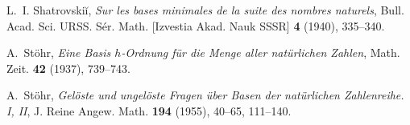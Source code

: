 \documentclass{amsart}
\begin{document}
\begin{thebibliography}{10}
L.~I. Shatrovski\u{i}, \emph{Sur les bases minimales de la suite des nombres
  naturels}, Bull. Acad. Sci. URSS. S\'er. Math. [Izvestia Akad. Nauk SSSR]
  \textbf{4} (1940), 335--340.

A.~St{\"o}hr, \emph{Eine {B}asis {$h$-O}rdnung f{\" u}r die {M}enge aller
  nat{\" u}rlichen {Z}ahlen}, Math. Zeit. \textbf{42} (1937), 739--743.

A.~St{\"o}hr, \emph{Gel\"oste und ungel\"oste {F}ragen \"uber {B}asen der
  nat\"urlichen {Z}ahlenreihe. {I}, {II}}, J. Reine Angew. Math. \textbf{194}
  (1955), 40--65, 111--140.

\end{thebibliography}
\end{document}
